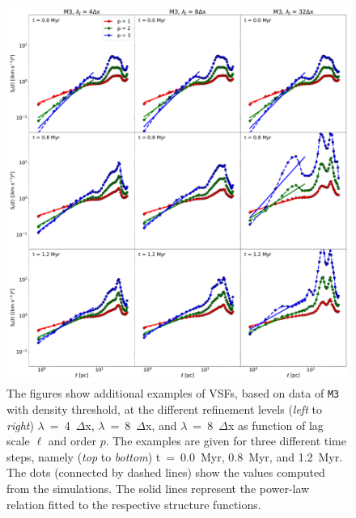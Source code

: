  	
\begin{figure}
    \centering
    \includegraphics[width=\textwidth]{app_examples_jeans_s_l.pdf}
    \caption{
        The figures show additional examples of VSFs, based on data of \texttt{M3} with density threshold, at the different refinement levels (\textit{left} to \textit{right}) $\lambda$~=~4~$\Delta$x, $\lambda$~=~8~$\Delta$x, and $\lambda$~=~8~$\Delta$x as function of lag scale $\ell$ and order $p$. 
        The examples are given for three different time steps, namely (\textit{top} to \textit{bottom}) t~=~0.0~Myr, 0.8~Myr, and 1.2~Myr.
        The dots (connected by dashed lines) show the values computed from the simulations. 
        The solid lines represent the power-law relation fitted to the respective structure functions.
    }
    \label{pic:appFigures:examples_jeans_s_vs_l}
\end{figure}


